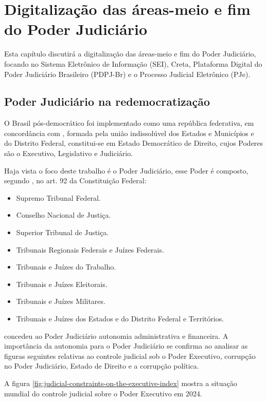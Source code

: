 \chapter{Digitalização das áreas-meio e fim do Poder Judiciário}

Esta capítulo discutirá a digitalização das áreas-meio e fim do Poder Judiciário, focando no Sistema Eletrônico de Informação (SEI), Creta, Plataforma Digital do Poder Judiciário Brasileiro (PDPJ-Br) e o  Processo Judicial Eletrônico (PJe).

\section{Poder Judiciário na redemocratização}

O Brasil pós-democrático foi implementado como uma república  federativa, em concordância com \cite{cf88}, formada pela união indissolúvel dos Estados e Municípios e do Distrito Federal, constitui-se em Estado Democrático de Direito, cujos Poderes são o Executivo, Legislativo e Judiciário.

Haja vista o foco deste trabalho é o Poder Judiciário, esse Poder é composto, segundo \cite{cf88}, no art. 92 da Constituição Federal:

\begin{itemize}
    \item Supremo Tribunal Federal.
    \item Conselho Nacional de Justiça.
    \item Superior Tribunal de Justiça.
    \item Tribunais Regionais Federais e Juízes Federais.
    \item Tribunais e Juízes do Trabalho.
    \item Tribunais e Juízes Eleitorais.
    \item Tribunais e Juízes Militares.
    \item  Tribunais e Juízes dos Estados e do Distrito Federal e Territórios.
\end{itemize}

\cite{cf88} concedeu ao Poder Judiciário autonomia administrativa e financeira. A importância da autonomia para o Poder Judiciário se confirma ao analisar as figuras seguintes relativas ao controle judicial sob o Poder Executivo,  corrupção no Poder Judiciário, Estado de Direito e a corrupção política.

A figura \ref{fig:judicial-constraints-on-the-executive-index} mostra a situação mundial do controle judicial sobre o Poder Executivo em 2024.

